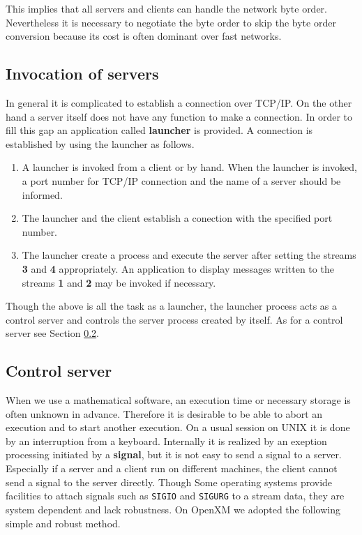 This implies that all servers and clients can handle the network byte
order. Nevertheless it is necessary to negotiate the byte order to
skip the byte order conversion because its cost is often dominant over
fast networks.

\subsection{Invocation of servers}
\label{launcher}

In general it is complicated to establish a connection over TCP/IP.
On the other hand a server itself does not have any function to
make a connection. In order to fill this gap an application called
{\bf launcher} is provided. A connection is established by using
the launcher as follows.

\begin{enumerate}
\item A launcher is invoked from a client or by hand.
When the launcher is invoked, a port number for TCP/IP connection
and the name of a server should be informed.
\item The launcher and the client establish a conection with the
specified port number.
\item The launcher create a process and execute the server after
setting the streams {\bf 3} and {\bf 4} appropriately.
An application to display messages written to the streams {\bf 1} and
{\bf 2} may be invoked if necessary.
\end{enumerate}

Though the above is all the task as a launcher, the launcher process
acts as a control server and controls the server process created by
itself. As for a control server see Section \ref{control}.

\subsection{Control server}
\label{control}
When we use a mathematical software, an execution time or necessary
storage is often unknown in advance. Therefore it is desirable
to be able to abort an execution and to start another execution.
On a usual session on UNIX it is done by an interruption from a keyboard.
Internally it is realized by an exeption processing initiated by
a {\bf signal}, but it is not easy to send a signal to a server.
Especially if a server and a client run on different machines,
the client cannot send a signal to the server directly.
Though Some operating systems provide facilities to attach 
signals such as {\tt SIGIO} and {\tt SIGURG} to a stream data, they are
system dependent and lack robustness.
On OpenXM we adopted the following simple and robust method.

